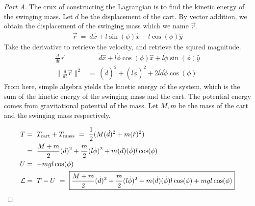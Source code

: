 \documentclass{article}
\numberwithin{equation}{section}
\newcommand{\deriv}[2]{
\frac {d {#1} } {d {#2}}
}
\begin{document}
\begin{proof} [Part A]
    The crux of constructing the Lagrangian is to find the 
    kinetic energy of the swinging mass. Let $d$ be the displacement 
    of the cart. By vector addition, we obtain the displacement of the 
    swinging mass which we name $\vec r$. 
    \begin{align}
        \vec r \ = \ d \hat x + l \sin(\phi) \hat x - l \cos(\phi) \hat y
    \end{align}
    Take the derivative to retrieve the velocity, and retrieve the 
    squred magnitude. 
    \begin{align}
        \deriv{}{t} \vec r & = \ \dot d \hat x + l \dot \phi \cos(\phi) \hat x + l \dot \phi \sin(\phi) \hat y \\ 
        \bigg\|\deriv{}{t} \vec r\bigg\|^2  & = \ (\dot d)^2 + (l \dot \phi)^2 + 2l \dot d \dot \phi \cos(\phi)
    \end{align}
    From here, simple algebra yields the kinetic energy of the 
    system, which is the sum of the kinetic energy of the swinging 
    mass and the cart. The potential energy comes from gravitational 
    potential of the mass. Let $M, m$ be the mass of the cart and the 
    swinging mass respectively. 

    \begin{align}
        T & = \ T_{\rm cart} + T_{\rm mass} \ = \ \frac 1 2 (M (\dot d )^2 + m (\dot r)^2) \\ 
        & = \ 
        \frac {M + m} 2 (\dot d)^2  + \frac m 2 (l \dot \phi)^2 + 
        m (\dot d) (\dot \phi) l \cos(\phi)  \\ 
        U & = \ -mgl \cos(\phi) \\ 
        \mathcal L & = \ T - U \ = \ \boxed{\frac {M + m} 2 (\dot d)^2  + \frac m 2 (l \dot \phi)^2 + 
        m (\dot d) (\dot \phi) l \cos(\phi) + mgl \cos(\phi)}
    \end{align}
\end{proof}
\end{document}
